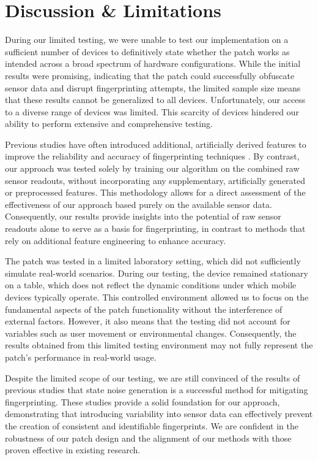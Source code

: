 \documentclass[11pt,
  oneside,openany,    %
]{scrreprt}
\begin{document}
\chapter{Discussion \& Limitations}
\label{chap:disc_and_limits}
During our limited testing, we were unable to test our implementation on a sufficient number of devices to definitively state whether the patch works as intended across a broad spectrum of hardware configurations.
While the initial results were promising, indicating that the patch could successfully obfuscate sensor data and disrupt fingerprinting attempts, the limited sample size means that these results cannot be generalized to all devices.
Unfortunately, our access to a diverse range of devices was limited.
This scarcity of devices hindered our ability to perform extensive and comprehensive testing.

Previous studies have often introduced additional, artificially derived features to improve the reliability and accuracy of fingerprinting techniques \cite{DBLP:journals/popets/DasBC18, DBLP:journals/tifs/ZhangBS21}.
By contrast, our approach was tested solely by training our algorithm on the combined raw sensor readouts, without incorporating any supplementary, artificially generated or preprocessed features.
This methodology allows for a direct assessment of the effectiveness of our approach based purely on the available sensor data.
Consequently, our results provide insights into the potential of raw sensor readouts alone to serve as a basis for fingerprinting, in contrast to methods that rely on additional feature engineering to enhance accuracy.

The patch was tested in a limited laboratory setting, which did not sufficiently simulate real-world scenarios.
During our testing, the device remained stationary on a table, which does not reflect the dynamic conditions under which mobile devices typically operate.
This controlled environment allowed us to focus on the fundamental aspects of the patch functionality without the interference of external factors. 
However, it also means that the testing did not account for variables such as user movement or environmental changes. 
Consequently, the results obtained from this limited testing environment may not fully represent the patch's performance in real-world usage.

Despite the limited scope of our testing, we are still convinced of the results of previous studies that state noise generation is a successful method for mitigating fingerprinting.
These studies provide a solid foundation for our approach, demonstrating that introducing variability into sensor data can effectively prevent the creation of consistent and identifiable fingerprints.
We are confident in the robustness of our patch design and the alignment of our methods with those proven effective in existing research.
\end{document}
